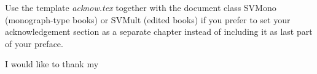 %
%


Use the template \emph{acknow.tex} together with the document class SVMono (monograph-type books) or SVMult (edited books) if you prefer to set your acknowledgement section as a separate chapter instead of including it as last part of your preface.

I would like to thank my 

